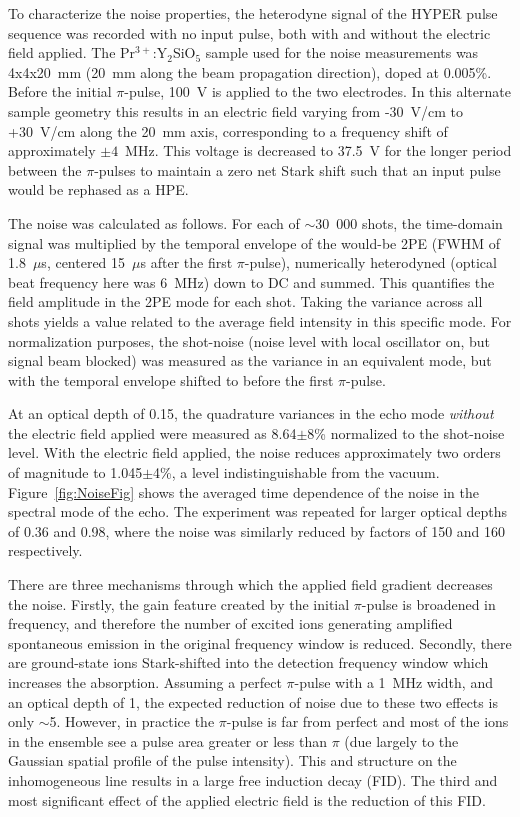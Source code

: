 \documentclass[superscriptaddress,pra,twocolumn,showpacs,amsmath,amssymb,aps,a4paper]{revtex4}
\newcommand{\PRYSO}{Pr$^{3+}$:Y$_2$SiO$_5$ }
\begin{document}
To characterize the noise properties, the heterodyne signal of the
HYPER pulse sequence was recorded with no input pulse, both with and
without the electric field applied. The \PRYSO sample used for the
noise measurements was 4x4x20~mm (20~mm along the beam propagation
direction), doped at 0.005\%.  Before the initial $\pi$-pulse, 100~V is
applied to the two electrodes. In this alternate sample geometry
this results in an electric field varying from -30~V/cm to
+30~V/cm along the 20~mm axis, corresponding to a frequency shift
of approximately $\pm4$~MHz.  This voltage is decreased to 37.5~V for the longer
period between the $\pi$-pulses to maintain a zero net Stark shift
such that an input pulse would be rephased as a HPE.


The noise was calculated as follows. For each of $\sim$30~000 shots,
the time-domain signal was multiplied by the temporal envelope of the
would-be 2PE (FWHM of 1.8~$\mu$s, centered 15~$\mu$s after the first
$\pi$-pulse), numerically heterodyned (optical beat frequency here was
6~MHz) down to DC and summed. This quantifies the field amplitude in
the 2PE mode for each shot. Taking the variance across all shots
yields a value related to the average field intensity in this specific
mode. For normalization purposes, the shot-noise (noise level with local
oscillator on, but signal beam blocked) was measured as the variance in an
equivalent mode, but with the temporal envelope shifted to before the
first $\pi$-pulse.

At an optical depth of 0.15, the quadrature variances in the echo mode
\emph{without} the electric field applied were measured as 8.64$\pm$8\%
normalized to the shot-noise level.  With the electric field applied,
the noise reduces approximately two orders of magnitude to 1.045$\pm$4\%,  a level indistinguishable from the vacuum.
Figure~\ref{fig:NoiseFig} shows the averaged time dependence of the
noise in the spectral mode of the echo. The experiment was repeated
for larger optical depths of 0.36 and 0.98, where the noise was
similarly reduced by factors of 150 and 160 respectively.

There are three mechanisms through which the applied field gradient
decreases the noise.  Firstly, the gain feature created by the initial
$\pi$-pulse is broadened in frequency, and therefore the number of
excited ions generating amplified spontaneous emission in the original
frequency window is reduced. Secondly, there are ground-state ions
Stark-shifted into the detection frequency window which increases the
absorption. Assuming a perfect $\pi$-pulse with a 1~MHz width, and an
optical depth of 1, the expected reduction of noise due to these two
effects is only $\sim$5. However, in practice the $\pi$-pulse is far
from perfect and most of the ions in the ensemble see a pulse area
greater or less than $\pi$ (due largely to the Gaussian spatial
profile of the pulse intensity). This and structure on the
inhomogeneous line results in a large free induction decay (FID). The
third and most significant effect of the applied electric field is the
reduction of this FID.
\end{document}
